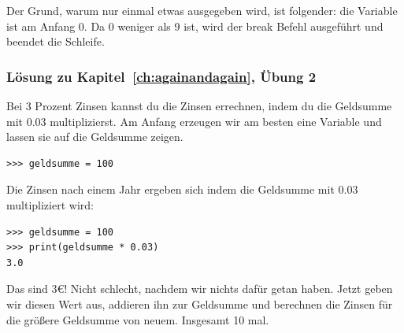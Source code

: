 \noindent
Der Grund, warum nur einmal etwas ausgegeben wird, ist folgender: die Variable  ist am Anfang 0. Da 0 weniger als 9 ist, wird der break Befehl ausgeführt und beendet die Schleife.

\noindent
\subsubsection{Lösung zu Kapitel~\ref{ch:againandagain}, Übung 2}
Bei 3 Prozent Zinsen kannst du die Zinsen errechnen, indem du die Geldsumme mit 0.03 multiplizierst. Am Anfang erzeugen wir am besten eine Variable und lassen sie auf die Geldsumme zeigen.

\begin{Verbatim}[frame=single]
>>> geldsumme = 100
\end{Verbatim}

Die Zinsen nach einem Jahr ergeben sich indem die Geldsumme mit 0.03 multipliziert wird:

\begin{Verbatim}[frame=single]
>>> geldsumme = 100
>>> print(geldsumme * 0.03)
3.0
\end{Verbatim}

Das sind 3€! Nicht schlecht, nachdem wir nichts dafür getan haben. Jetzt geben wir diesen Wert aus, addieren ihn zur Geldsumme und berechnen die Zinsen für die größere Geldsumme von neuem. Insgesamt 10 mal.

